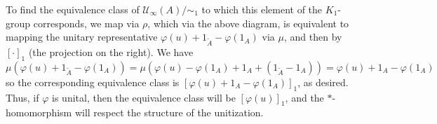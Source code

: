 \documentclass[aps,pra,showpacs,notitlepage,onecolumn,superscriptaddress,nofootinbib]{revtex4-1}
\theoremstyle{definition}
\begin{document}
To find the equivalence class of $\mathcal{U}_{\infty}(A)/\sim_1$ to which this element of the $K_1$-group corresponds, we map via $\rho$, which via the above diagram,
is equivalent to mapping the unitary representative $\varphi(u) + 1_{\widetilde{A}} - \varphi(1_A)$ via $\mu$, and then by $[\cdot]_1$ (the projection on the right). We have
\begin{equation}
  \mu(\varphi(u) + 1_{\widetilde{A}} - \varphi(1_A)) = \mu(\varphi(u) - \varphi(1_A) + 1_A + (1_{\widetilde{A}} - 1_A)) = \varphi(u) + 1_A - \varphi(1_A)
\end{equation}
so the corresponding equivalence class is $[\varphi(u) + 1_A - \varphi(1_A)]_1$, as desired. Thus, if $\varphi$ is unital, then the equivalence class will be $[\varphi(u)]_1$,
and the $*$-homomorphism will respect the structure of the unitization.

\begin{comment}
\section{RLL Problem 8.6}

\noindent Suppose that $\varphi(v) = u \oplus 1_{m - n}$, for some $m \geq n$. Via the identification, $[u]_1$ is identified with $[u + (1_{\widetilde{B}} - 1_B)]_1$. Note that
\begin{equation}
  \widetilde{\varphi}(v + (1_{\widetilde{A}} - 1_A)) = \varphi(v) - \varphi(1_A) + 1_{\widetilde{A}} = 
  \end{equation}

\noindent Suppose  that $[u]_1 \in\text{Im}( K_1(\varphi))$. Once again, recall that via the identification, this is precisely the condition that $[u + (1_{\widetilde{B}} - 1_B)]_1$
be in the image of $K_1(\varphi)$. Thus, we have $\widetilde{\varphi}(v') \sim_1 u + (1_{\widetilde{B}} - 1_B)$ for some unitary $v' \in \mathcal{U}_{\infty}(\widetilde{A})$. Note that since the algebra
$A$ is unital, we can decompose $v' = v + \alpha (1_{\widetilde{A}} - 1_{A})$. We must have $(v')^{*} v' = 1_{\widetilde{A}}$, which gives $v^{*} v = |\alpha|^2 1_A$ and $|\alpha|^2 = 1$, so
$v$ is a unitary in $\mathcal{U}_{\infty}(A)$. Now, we must have
\begin{equation}
  \varphi(v) + e^{i \theta} 1_{\widetilde{B}} - e^{i \theta} \varphi(1_A) \sim_1 \varphi(v) + 1_{\widetilde{B}} - \varphi(1_A) \sim_1 u + (1_{\widetilde{B}} - 1_B)
\end{equation}
which implies that $\varphi(v) - \varphi(1_A) \sim_1 u - 1_B$.
\end{comment}
\end{document}
